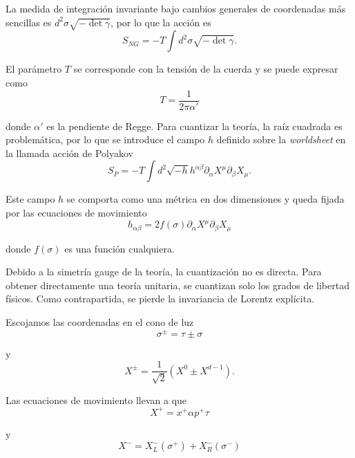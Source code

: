 La medida de integración invariante bajo cambios generales de coordenadas más sencillas 
es $d^2\sigma \sqrt{-\det\gamma}$, por lo que la acción es
\begin{equation}
  S_{NG}=-T\int d^2\sigma \sqrt{-\det\gamma}.
\end{equation}

El parámetro $T$ se corresponde con la tensión de la cuerda y se puede expresar como
\begin{equation}
  T=\frac{1}{2\pi\alpha'}
\end{equation}

donde $\alpha'$ es la pendiente de Regge.
Para cuantizar la teoría, la raíz cuadrada es problemática, por lo que se introduce
el campo $h$ definido sobre la \emph{worldsheet} en la llamada acción de Polyakov
\begin{equation}
  S_P=-T\int d^2  \sqrt{-h}h^{\alpha\beta}\partial_\alpha X^\mu \partial_\beta X_\mu.
\end{equation}

Este campo $h$ se comporta como una métrica en dos dimensiones y queda fijada por las
ecuaciones de movimiento
\begin{equation}
  h_{\alpha\beta}=2f(\sigma)\partial_\alpha X^\mu \partial_\beta X_\mu
\end{equation}

donde $f(\sigma)$ es una función cualquiera.


Debido a la simetría gauge de la teoría, la cuantización no es directa.
Para obtener directamente una teoría unitaria, se cuantizan solo los grados de libertad 
físicos. Como contrapartida, se pierde la invariancia de Lorentz explícita.

Escojamos las coordenadas en el cono de luz
\begin{equation}
  \sigma^\pm=\tau\pm\sigma
\end{equation}

y
\begin{equation}
  X^\pm=\frac{1}{\sqrt 2} (X^0 \pm X^{d-1}).
\end{equation}

Las ecuaciones de movimiento llevan a que 
\begin{equation}
  X^+=x^+\alpha p^+ \tau
\end{equation}

y
\begin{equation}
  X^-=X^-_L(\sigma^+)+X^-_R(\sigma^-)
\end{equation}

